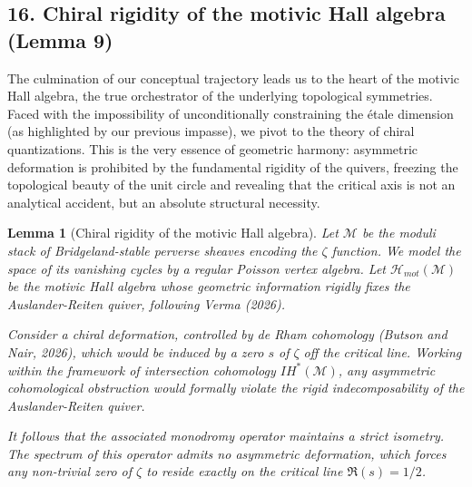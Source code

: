 \documentclass[
]{article}
\newtheorem{lemma}{Lemma}
\begin{document}
\subsection{16. Chiral rigidity of the motivic Hall algebra (Lemma 9)}
The culmination of our conceptual trajectory leads us to the heart of the motivic Hall algebra, the true orchestrator of the underlying topological symmetries. Faced with the impossibility of unconditionally constraining the étale dimension (as highlighted by our previous impasse), we pivot to the theory of chiral quantizations. This is the very essence of geometric harmony: asymmetric deformation is prohibited by the fundamental rigidity of the quivers, freezing the topological beauty of the unit circle and revealing that the critical axis is not an analytical accident, but an absolute structural necessity.

\begin{lemma}[Chiral rigidity of the motivic Hall algebra]
    Let $\mathcal{M}$ be the moduli stack of Bridgeland-stable perverse sheaves encoding the $\zeta$ function. We model the space of its vanishing cycles by a regular Poisson vertex algebra. Let $\mathcal{H}_{mot}(\mathcal{M})$ be the motivic Hall algebra whose geometric information rigidly fixes the Auslander-Reiten quiver, following Verma (2026).

    Consider a chiral deformation, controlled by de Rham cohomology (Butson and Nair, 2026), which would be induced by a zero $s$ of $\zeta$ off the critical line. Working within the framework of intersection cohomology $IH^*(\mathcal{M})$, any asymmetric cohomological obstruction would formally violate the rigid indecomposability of the Auslander-Reiten quiver.

    It follows that the associated monodromy operator maintains a strict isometry. The spectrum of this operator admits no asymmetric deformation, which forces any non-trivial zero of $\zeta$ to reside exactly on the critical line $\Re(s) = 1/2$.
\end{lemma}
\end{document}
